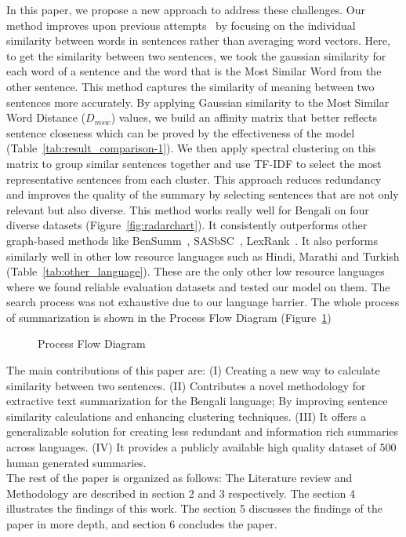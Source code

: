 In this paper, we propose a new approach to address these challenges.
Our method improves upon previous
attempts~\cite{roychowdhury-etal-2022-spectral-base}
by focusing on the individual similarity between words
in sentences rather than averaging word vectors.
Here, to get the similarity between two sentences,
we took the gaussian similarity for each word of a sentence and
the word that is the Most Similar Word from the other sentence.
This method captures the similarity of meaning between
two sentences more accurately.
By applying Gaussian similarity to the Most Similar
Word Distance ($D_{msw}$) values, we build an affinity matrix that
better reflects sentence closeness which can be proved
by the effectiveness of the model (Table~\ref{tab:result_comparison-1}).
We then apply spectral clustering on this matrix to
group similar sentences together and use TF-IDF to select the
most representative sentences from each cluster.
This approach reduces redundancy and improves the
quality of the summary by selecting sentences that are not only
relevant but also diverse.
This method works really well for Bengali on four
diverse datasets (Figure~\ref{fig:radarchart}).
It consistently outperforms other graph-based methods
like BenSumm~\cite{chowdhury-etal-2021-tfidf-clustering},
SASbSC~\cite{roychowdhury-etal-2022-spectral-base},
LexRank~\cite{Erkan-lexRank-2004}.
It also performs similarly well in other low resource languages such as
Hindi, Marathi and Turkish (Table~\ref{tab:other_language}).
These are the only other low resource languages
where we found reliable evaluation datasets and tested our model on them.
The search process was not exhaustive due to our language barrier.
The whole process of summarization is shown in the Process Flow Diagram (Figure~\ref{fig:process-flow-diagram})\\

\begin{figure}
    \centering
    
    \caption{Process Flow Diagram}
    \label{fig:process-flow-diagram}
\end{figure}

The main contributions of this paper are:
(I) Creating a new way to calculate similarity
between two sentences.
(II) Contributes a novel methodology for extractive
text summarization for the Bengali language;
By improving sentence similarity calculations and
enhancing clustering techniques.
(III) It offers a generalizable solution for creating less
redundant and information rich summaries across languages.
(IV) It provides a publicly available high quality dataset
of 500 human generated summaries.\\

The rest of the paper is organized as follows:
The Literature review and Methodology are described in
section 2 and 3 respectively.
The section 4 illustrates the findings of this work.
The section 5 discusses the findings of the paper in more depth,
and section 6 concludes the paper.
